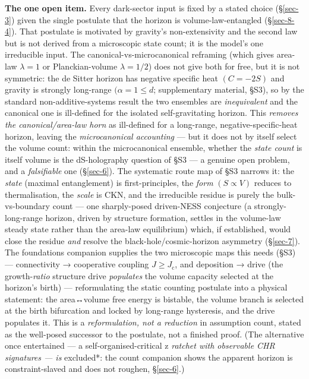 \documentclass[preprint,12pt]{elsarticle}
\begin{document}
\textbf{The one open item.} Every dark-sector input is fixed by a stated
choice (§\ref{sec-3}) given the single postulate that the horizon is
volume-law-entangled (§\ref{sec-8-4}). That postulate is motivated by
gravity's non-extensivity and the second law but is not derived from a
microscopic state count; it is the model's one irreducible input. The
canonical-vs-microcanonical reframing (which gives area-law
\(\lambda  = 1\) or Planckian-volume \(\lambda  = 1/2\)) does not give
both for free, but it is not symmetric: the de Sitter horizon has
negative specific heat \((C = -2S)\) and gravity is strongly long-range
\((\alpha  = 1 \leq  d\); supplementary material, §S3), so by the
standard non-additive-systems result \citep{Campa:2009jxa} the two
ensembles are \emph{inequivalent} and the canonical one is ill-defined
for the isolated self-gravitating horizon. This \emph{removes the
canonical/area-law horn} as ill-defined for a long-range,
negative-specific-heat horizon, leaving the \emph{microcanonical
accounting} --- but it does not by itself select the volume count:
within the microcanonical ensemble, whether the \emph{state count} is
itself volume is the dS-holography question of §S3 --- a genuine open
problem, and a \emph{falsifiable} one (§\ref{sec-6}). The systematic
route map of §S3 narrows it: the \emph{state} (maximal entanglement) is
first-principles, the \emph{form} \((S \propto  V)\) reduces to
thermalisation, the \emph{scale} is CKN, and the irreducible residue is
purely the bulk-vs-boundary count --- one sharply-posed driven-NESS
conjecture (a strongly-long-range horizon, driven by structure
formation, settles in the volume-law steady state rather than the
area-law equilibrium) which, if established, would close the residue
\emph{and} resolve the black-hole/cosmic-horizon asymmetry
(§\ref{sec-7}). The foundations companion supplies the two microscopic
maps this needs (§S3) --- connectivity → cooperative coupling
\(J \geq  J_{\mathrm{c}}\), and deposition → drive (the
growth-\emph{ratio} structure drive \emph{populates} the volume capacity
selected at the horizon's birth) --- reformulating the static counting
postulate into a physical statement: the area↔volume free energy is
bistable, the volume branch is selected at the birth bifurcation and
locked by long-range hysteresis, and the drive populates it. This is a
\emph{reformulation, not a reduction} in assumption count, stated as the
well-posed successor to the postulate, not a finished proof. (The
alternative once entertained --- a self-organised-critical z\emph{
ratchet with observable CHR signatures --- is }excluded*: the count
companion \citep{Pandev:2026count} shows the apparent horizon is
constraint-slaved and does not roughen, §\ref{sec-6}.)
\end{document}
